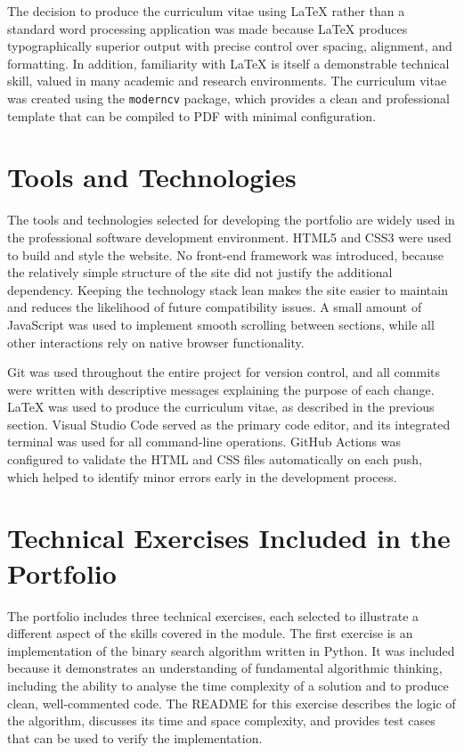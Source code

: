 \documentclass[12pt,a4paper]{article}
\begin{document}
The decision to produce the curriculum vitae using \LaTeX{} rather than a standard word processing application was made because \LaTeX{} produces typographically superior output with precise control over spacing, alignment, and formatting. In addition, familiarity with \LaTeX{} is itself a demonstrable technical skill, valued in many academic and research environments. The curriculum vitae was created using the \texttt{moderncv} package, which provides a clean and professional template that can be compiled to PDF with minimal configuration.

\section{Tools and Technologies}

The tools and technologies selected for developing the portfolio are widely used in the professional software development environment. HTML5 and CSS3 were used to build and style the website. No front-end framework was introduced, because the relatively simple structure of the site did not justify the additional dependency. Keeping the technology stack lean makes the site easier to maintain and reduces the likelihood of future compatibility issues. A small amount of JavaScript was used to implement smooth scrolling between sections, while all other interactions rely on native browser functionality.

Git was used throughout the entire project for version control, and all commits were written with descriptive messages explaining the purpose of each change. \LaTeX{} was used to produce the curriculum vitae, as described in the previous section. Visual Studio Code served as the primary code editor, and its integrated terminal was used for all command-line operations. GitHub Actions was configured to validate the HTML and CSS files automatically on each push, which helped to identify minor errors early in the development process.

\section{Technical Exercises Included in the Portfolio}

The portfolio includes three technical exercises, each selected to illustrate a different aspect of the skills covered in the module. The first exercise is an implementation of the binary search algorithm written in Python. It was included because it demonstrates an understanding of fundamental algorithmic thinking, including the ability to analyse the time complexity of a solution and to produce clean, well-commented code. The README for this exercise describes the logic of the algorithm, discusses its time and space complexity, and provides test cases that can be used to verify the implementation.
\end{document}
